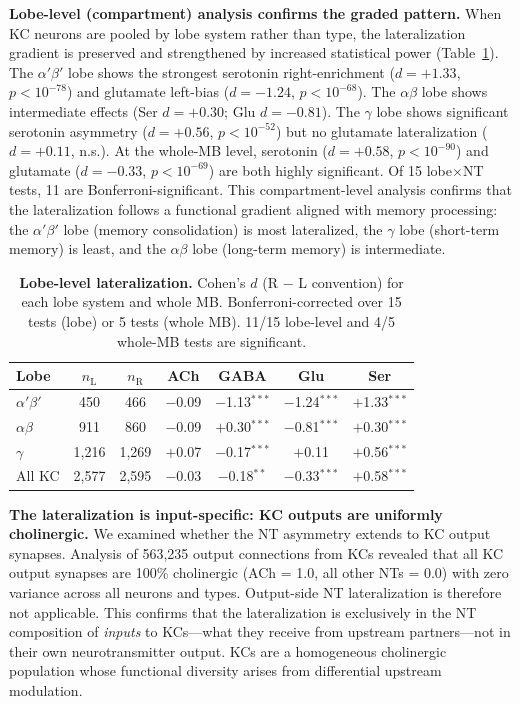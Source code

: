 \documentclass[10pt]{article}
\begin{document}
\textbf{Lobe-level (compartment) analysis confirms the graded pattern.} When KC neurons are pooled by lobe system rather than type, the lateralization gradient is preserved and strengthened by increased statistical power (Table~\ref{tab:lobe}). The $\alpha'\beta'$ lobe shows the strongest serotonin right-enrichment ($d = +1.33$, $p < 10^{-78}$) and glutamate left-bias ($d = -1.24$, $p < 10^{-68}$). The $\alpha\beta$ lobe shows intermediate effects (Ser $d = +0.30$; Glu $d = -0.81$). The $\gamma$ lobe shows significant serotonin asymmetry ($d = +0.56$, $p < 10^{-52}$) but no glutamate lateralization ($d = +0.11$, n.s.). At the whole-MB level, serotonin ($d = +0.58$, $p < 10^{-90}$) and glutamate ($d = -0.33$, $p < 10^{-69}$) are both highly significant. Of 15 lobe$\times$NT tests, 11 are Bonferroni-significant. This compartment-level analysis confirms that the lateralization follows a functional gradient aligned with memory processing: the $\alpha'\beta'$ lobe (memory consolidation) is most lateralized, the $\gamma$ lobe (short-term memory) is least, and the $\alpha\beta$ lobe (long-term memory) is intermediate.

\begin{table}[!ht]
\centering\small
\caption{\textbf{Lobe-level lateralization.} Cohen's $d$ (R $-$ L convention) for each lobe system and whole MB. Bonferroni-corrected over 15 tests (lobe) or 5 tests (whole MB). 11/15 lobe-level and 4/5 whole-MB tests are significant.}
\label{tab:lobe}
\begin{tabular}{@{}lcccccc@{}}
\toprule
Lobe & $n_\mathrm{L}$ & $n_\mathrm{R}$ & ACh & GABA & Glu & Ser \\
\midrule
$\alpha'\beta'$ & 450 & 466 & $-$0.09 & $-$1.13$^{\ast\ast\ast}$ & $-$1.24$^{\ast\ast\ast}$ & $+$1.33$^{\ast\ast\ast}$ \\
$\alpha\beta$   & 911 & 860 & $-$0.09 & $+$0.30$^{\ast\ast\ast}$ & $-$0.81$^{\ast\ast\ast}$ & $+$0.30$^{\ast\ast\ast}$ \\
$\gamma$        & 1,216 & 1,269 & $+$0.07 & $-$0.17$^{\ast\ast\ast}$ & $+$0.11 & $+$0.56$^{\ast\ast\ast}$ \\
\midrule
All KC          & 2,577 & 2,595 & $-$0.03 & $-$0.18$^{\ast\ast}$ & $-$0.33$^{\ast\ast\ast}$ & $+$0.58$^{\ast\ast\ast}$ \\
\bottomrule
\end{tabular}
\end{table}

\textbf{The lateralization is input-specific: KC outputs are uniformly cholinergic.} We examined whether the NT asymmetry extends to KC output synapses. Analysis of 563,235 output connections from KCs revealed that all KC output synapses are 100\% cholinergic (ACh = 1.0, all other NTs = 0.0) with zero variance across all neurons and types. Output-side NT lateralization is therefore not applicable. This confirms that the lateralization is exclusively in the NT composition of \textit{inputs} to KCs---what they receive from upstream partners---not in their own neurotransmitter output. KCs are a homogeneous cholinergic population whose functional diversity arises from differential upstream modulation.
\end{document}
